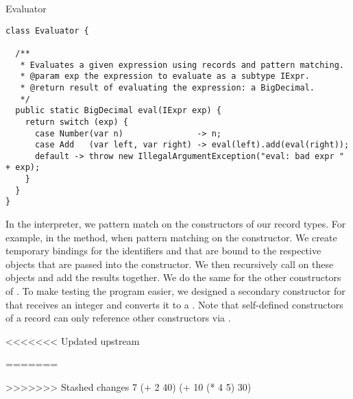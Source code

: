 \begin{verbnobox}[\footnotesize]
\begin{verbnobox}[\footnotesize]
\begin{cl}[]{Evaluator}
\begin{lstlisting}[language=MyJava]
class Evaluator {

  /**
   * Evaluates a given expression using records and pattern matching.
   * @param exp the expression to evaluate as a subtype IExpr.
   * @return result of evaluating the expression: a BigDecimal.
   */
  public static BigDecimal eval(IExpr exp) {
    return switch (exp) {
      case Number(var n)               -> n;
      case Add   (var left, var right) -> eval(left).add(eval(right));
      default -> throw new IllegalArgumentException("eval: bad expr " + exp);
    }
  }
}
\end{lstlisting}
\end{cl}

In the interpreter, we pattern match on the constructors of our record types. For example, in the  method, when pattern matching on the  constructor. We create temporary bindings for the identifiers  and  that are bound to the respective  objects that are passed into the constructor. We then recursively call  on these objects and add the results together. We do the same for the other constructors of . To make testing the program easier, we designed a secondary constructor for  that receives an integer and converts it to a . Note that self-defined constructors of a record can only reference other constructors via .

<<<<<<< Updated upstream
\begin{verbnobox}[\footnotesize]
=======
\begin{verbnobox}[\small]
>>>>>>> Stashed changes
7
(+ 2 40)
(+ 10 (* 4 5) 30)
\end{verbnobox}


\end{verbnobox}
\end{verbnobox}
\end{verbnobox}
